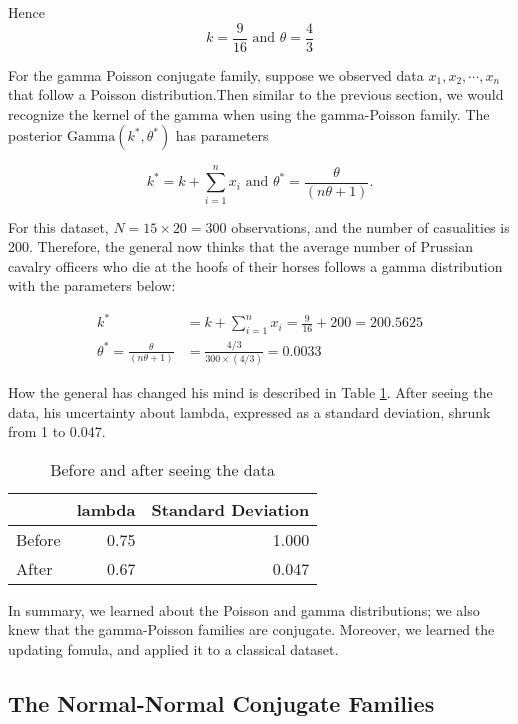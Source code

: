 \documentclass[]{book}
\theoremstyle{definition}
\theoremstyle{definition}
\theoremstyle{remark}
\begin{document}
Hence \[k = \frac{9}{16} \text{ and } \theta = \frac{4}{3}\]

For the gamma Poisson conjugate family, suppose we observed data
\(x_1, x_2, \cdots, x_n\) that follow a Poisson distribution.Then
similar to the previous section, we would recognize the kernel of the
gamma when using the gamma-Poisson family. The posterior
\(\text{Gamma}(k^*, \theta^*)\) has parameters

\[k^* = k + \sum^n_{i=1} x_i \text{ and } \theta^* = \frac{\theta}{(n\theta+1)}.\]

For this dataset, \(N = 15 \times 20 = 300\) observations, and the
number of casualities is 200. Therefore, the general now thinks that the
average number of Prussian cavalry officers who die at the hoofs of
their horses follows a gamma distribution with the parameters below:

\[\begin{aligned}
k^* &= k + \sum^n_{i=1} x_i = \frac{9}{16} + 200 = 200.5625 \\
\theta^* = \frac{\theta}{(n\theta+1)} &= \frac{4/3}{300\times(4/3)} = 0.0033
\end{aligned}\]

How the general has changed his mind is described in Table
\ref{tab:before-after}. After seeing the data, his uncertainty about
lambda, expressed as a standard deviation, shrunk from 1 to 0.047.

\begin{table}

\caption{\label{tab:before-after}Before and after seeing the data}
\centering
\begin{tabular}[t]{lrr}
\toprule
  & lambda & Standard Deviation\\
\midrule
Before & 0.75 & 1.000\\
After & 0.67 & 0.047\\
\bottomrule
\end{tabular}
\end{table}

In summary, we learned about the Poisson and gamma distributions; we
also knew that the gamma-Poisson families are conjugate. Moreover, we
learned the updating fomula, and applied it to a classical dataset.

\subsection{The Normal-Normal Conjugate
Families}\label{sec:normal-normal}
\end{document}
